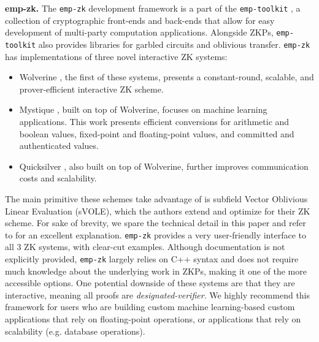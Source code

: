 \textbf{emp-zk.}
 The \texttt{emp-zk} development framework \cite{empzk} is a part of the \texttt{emp-toolkit} \cite{emptool}, a collection of cryptographic front-ends and back-ends that allow for easy development of multi-party computation applications. Alongside ZKPs, \texttt{emp-toolkit} also provides libraries for garbled circuits and oblivious transfer. \texttt{emp-zk} has implementations of three novel interactive ZK systems:
\begin{itemize}
    \item Wolverine \cite{weng2021wolverine}, the first of these systems, presents a constant-round, scalable, and prover-efficient interactive ZK scheme.
    \item Mystique \cite{weng2021mystique}, built on top of Wolverine, focuses on machine learning applications. This work presents efficient conversions for arithmetic and boolean values, fixed-point and floating-point values, and committed and authenticated values. 
    \item Quicksilver \cite{yang2021quicksilver}, also built on top of Wolverine, further improves communication costs and scalability.
\end{itemize}

The main primitive these schemes take advantage of is subfield Vector Oblivious Linear Evaluation (sVOLE), which the authors extend and optimize for their ZK scheme. 
For sake of brevity, we spare the technical detail in this paper and refer to \cite{Weng2023VOLEBasedInteractive} for an excellent explanation. \texttt{emp-zk} provides a very user-friendly interface to all 3 ZK systems, with clear-cut examples. Although documentation is not explicitly provided, \texttt{emp-zk} largely relies on C++ syntax and does not require much knowledge about the underlying work in ZKPs, making it one of the more accessible options. One potential downside of these systems are that they are interactive, meaning all proofs are \textit{designated-verifier}. We highly recommend this framework for users who are building custom machine learning-based custom applications that rely on floating-point operations, or applications that rely on scalability (e.g. database operations).

